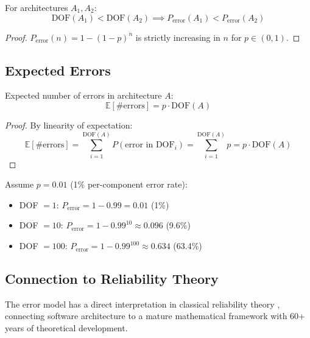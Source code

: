 \begin{corollary}\label{cor:dof-monotone}
For architectures $A_1, A_2$:
\[
\text{DOF}(A_1) < \text{DOF}(A_2) \implies P_{\text{error}}(A_1) < P_{\text{error}}(A_2)
\]
\end{corollary}

\begin{proof}
$P_{\text{error}}(n) = 1 - (1-p)^n$ is strictly increasing in $n$ for $p \in (0,1)$.
\end{proof}

\subsection{Expected Errors}

\begin{theorem}\label{thm:expected-errors}
Expected number of errors in architecture $A$:
\[
\mathbb{E}[\text{\# errors}] = p \cdot \text{DOF}(A)
\]
\end{theorem}

\begin{proof}
By linearity of expectation:
\[
\mathbb{E}[\text{\# errors}] = \sum_{i=1}^{\text{DOF}(A)} P(\text{error in DOF}_i) = \sum_{i=1}^{\text{DOF}(A)} p = p \cdot \text{DOF}(A)
\]
\end{proof}

\begin{example}
Assume $p = 0.01$ (1\% per-component error rate):
\begin{itemize}
\item DOF $= 1$: $P_{\text{error}} = 1 - 0.99 = 0.01$ (1\%)
\item DOF $= 10$: $P_{\text{error}} = 1 - 0.99^{10} \approx 0.096$ (9.6\%)
\item DOF $= 100$: $P_{\text{error}} = 1 - 0.99^{100} \approx 0.634$ (63.4\%)
\end{itemize}
\end{example}

\subsection{Connection to Reliability Theory}

The error model has a direct interpretation in classical reliability theory \cite{patterson2013computer}, connecting software architecture to a mature mathematical framework with 60+ years of theoretical development.

